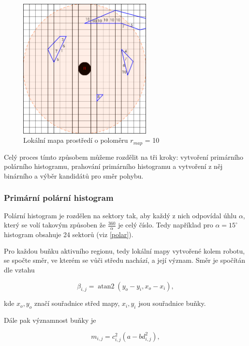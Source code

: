 \documentclass[twoside]{ctuthesis}
\theoremstyle{plain}
\theoremstyle{definition}
\theoremstyle{note}
\DeclareMathOperator{\atantwo}{atan2}
\begin{document}
\begin{figure}
	\caption{Lokální mapa prostředí o poloměru $r_{map}$ = 10}
	
	\label{mrizka}
	\includegraphics[width=0.6\textwidth, height = 0.6\textwidth]{images/3/mrizka.png}
\end{figure}

Celý proces tímto způsobem můžeme rozdělit na tři kroky: vytvoření primárního polárního histogramu, prahování primárního histogramu a vytvoření z něj binárního a výběr kandidátů pro směr pohybu.

\subsubsection{Primární polární histogram}

Polární histogram je rozdělen na sektory tak, aby každý z nich odpovídal úhlu $\alpha$, který se volí takovým způsoben že $\frac{360}{\alpha}$ je celý číslo. Tedy například pro $\alpha = 15^{\circ}$ histogram obsahuje 24 sektorů (viz \ref{polar}).

Pro každou buňku aktivního regionu, tedy lokální mapy vytvořené kolem robotu, se spočte směr, ve kterém se vůči středu nachází, a její význam.
Směr je spočítán dle vztahu

\begin{equation}
\beta_{i,j} = 	\atantwo ( y_o - y_i, x_o - x_i),
\end{equation}

kde $x_o, y_o$ značí souřadnice střed mapy, $x_i, y_i$ jsou souřadnice buňky.	

Dále pak významnost buňky je

\begin{equation}
m_{i,j} = c_{i,j}^2(a - bd_{i,j}^2),
\end{equation}
\end{document}
